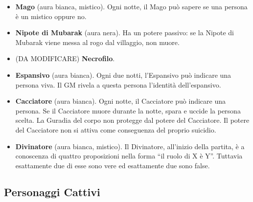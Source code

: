 \documentclass[a4paper,10pt]{article}
\begin{document}
\begin{itemize}
 \item {\bf Mago} (aura bianca, mistico). Ogni notte, il Mago può sapere se una persona è un mistico oppure no.
 
 \item {\bf Nipote di Mubarak} (aura nera). Ha un potere passivo: se la Nipote di Mubarak viene messa al rogo dal villaggio, non muore.

 \item (DA MODIFICARE) {\bf Necrofilo}.
 
 \item {\bf Espansivo} (aura bianca). Ogni due notti, l'Espansivo può indicare una persona viva. Il GM rivela a questa persona l'identità dell'espansivo.

 \item {\bf Cacciatore} (aura bianca). Ogni notte, il Cacciatore può indicare una persona. Se il Cacciatore muore durante la notte, spara e uccide la persona scelta.
 La Guradia del corpo non protegge dal potere del Cacciatore.
 Il potere del Cacciatore non si attiva come conseguenza del proprio suicidio.

 \item {\bf Divinatore} (aura bianca, mistico). Il Divinatore, all'inizio della partita, è a conoscenza di quattro proposizioni nella forma ``il ruolo di X è Y''. Tuttavia esattamente due di esse sono vere ed esattamente due sono false.
 
\end{itemize}


\subsection*{Personaggi Cattivi}
\end{document}
